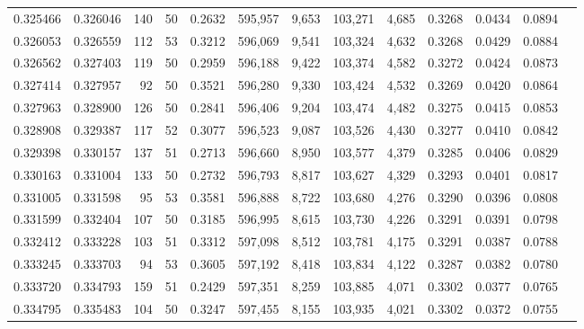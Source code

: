 \begin{tabular}{rrrrrrrrrrrrr}
0.325466 & 0.326046 &   140 &  50 &                                     0.2632 & 595,957 &   9,653 & 103,271 &   4,685 & 0.3268 & 0.0434 & 0.0894 \\
0.326053 & 0.326559 &   112 &  53 &                                     0.3212 & 596,069 &   9,541 & 103,324 &   4,632 & 0.3268 & 0.0429 & 0.0884 \\
0.326562 & 0.327403 &   119 &  50 &                                     0.2959 & 596,188 &   9,422 & 103,374 &   4,582 & 0.3272 & 0.0424 & 0.0873 \\
0.327414 & 0.327957 &    92 &  50 &                                     0.3521 & 596,280 &   9,330 & 103,424 &   4,532 & 0.3269 & 0.0420 & 0.0864 \\
0.327963 & 0.328900 &   126 &  50 &                                     0.2841 & 596,406 &   9,204 & 103,474 &   4,482 & 0.3275 & 0.0415 & 0.0853 \\
0.328908 & 0.329387 &   117 &  52 &                                     0.3077 & 596,523 &   9,087 & 103,526 &   4,430 & 0.3277 & 0.0410 & 0.0842 \\
0.329398 & 0.330157 &   137 &  51 &                                     0.2713 & 596,660 &   8,950 & 103,577 &   4,379 & 0.3285 & 0.0406 & 0.0829 \\
0.330163 & 0.331004 &   133 &  50 &                                     0.2732 & 596,793 &   8,817 & 103,627 &   4,329 & 0.3293 & 0.0401 & 0.0817 \\
0.331005 & 0.331598 &    95 &  53 &                                     0.3581 & 596,888 &   8,722 & 103,680 &   4,276 & 0.3290 & 0.0396 & 0.0808 \\
0.331599 & 0.332404 &   107 &  50 &                                     0.3185 & 596,995 &   8,615 & 103,730 &   4,226 & 0.3291 & 0.0391 & 0.0798 \\
0.332412 & 0.333228 &   103 &  51 &                                     0.3312 & 597,098 &   8,512 & 103,781 &   4,175 & 0.3291 & 0.0387 & 0.0788 \\
0.333245 & 0.333703 &    94 &  53 &                                     0.3605 & 597,192 &   8,418 & 103,834 &   4,122 & 0.3287 & 0.0382 & 0.0780 \\
0.333720 & 0.334793 &   159 &  51 &                                     0.2429 & 597,351 &   8,259 & 103,885 &   4,071 & 0.3302 & 0.0377 & 0.0765 \\
0.334795 & 0.335483 &   104 &  50 &                                     0.3247 & 597,455 &   8,155 & 103,935 &   4,021 & 0.3302 & 0.0372 & 0.0755 \\

\end{tabular}
